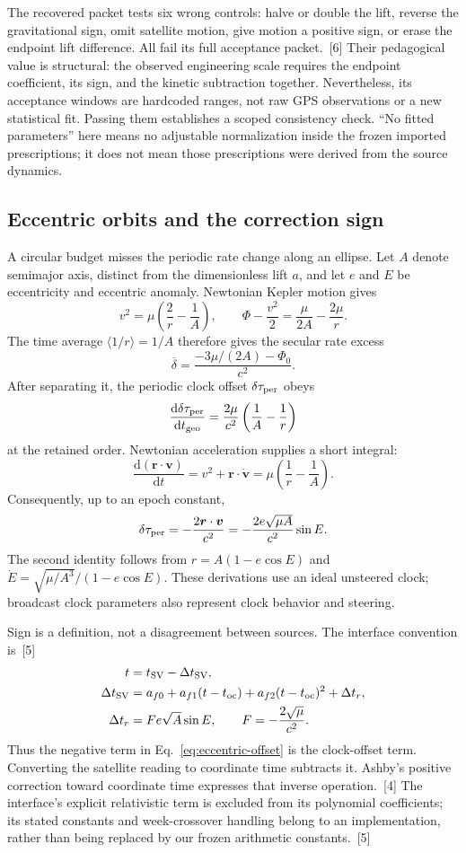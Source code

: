 \documentclass[10pt,twocolumn,letterpaper]{article}
\newcommand{\dd}{\mathrm{d}}
\begin{document}
The recovered packet tests six wrong controls: halve or double the lift, reverse the gravitational sign, omit satellite motion, give motion a positive sign, or erase the endpoint lift difference. All fail its full acceptance packet.~[6] Their pedagogical value is structural: the observed engineering scale requires the endpoint coefficient, its sign, and the kinetic subtraction together. Nevertheless, its acceptance windows are hardcoded ranges, not raw GPS observations or a new statistical fit. Passing them establishes a scoped consistency check. ``No fitted parameters'' here means no adjustable normalization inside the frozen imported prescriptions; it does not mean those prescriptions were derived from the source dynamics.


\subsection{Eccentric orbits and the correction sign}
A circular budget misses the periodic rate change along an ellipse. Let $A$ denote semimajor axis, distinct from the dimensionless lift $a$, and let $e$ and $E$ be eccentricity and eccentric anomaly. Newtonian Kepler motion gives
\[
 v^2=\mu\left(\frac 2r-\frac 1A\right),\qquad
 \Phi-\frac{v^2}{2}=\frac{\mu}{2A}-\frac{2\mu}{r}.
\]
The time average $\langle 1/r\rangle=1/A$ therefore gives the secular rate excess
\[
 \overline\delta=\frac{-3\mu/(2A)-\Phi_0}{c^2}.
\]
After separating it, the periodic clock offset $\delta\tau_{\rm per}$ obeys
\[
 \frac{\dd\delta\tau_{\rm per}}{\dd t_{\rm geo}}
 =\frac{2\mu}{c^2}\left(\frac 1A-\frac 1r\right)
\]
at the retained order. Newtonian acceleration supplies a short integral:
\[
 \frac{\dd(\bm r\cdot\bm v)}{\dd t}
 =v^2+\bm r\cdot\dot{\bm v}
 =\mu\left(\frac 1r-\frac 1A\right).
\]
Consequently, up to an epoch constant,
\begin{equation}
 \delta\tau_{\rm per}
 =-\frac{2\bm r\cdot\bm v}{c^2}
 =-\frac{2e\sqrt{\mu A}}{c^2}\sin E.
 \label{eq:eccentric-offset}
\end{equation}
The second identity follows from $r=A(1-e\cos E)$ and $\dot E=\sqrt{\mu/A^3}/(1-e\cos E)$. These derivations use an ideal unsteered clock; broadcast clock parameters also represent clock behavior and steering.

Sign is a definition, not a disagreement between sources. The interface convention is~[5]
\begin{align*}
 t&=t_{\rm SV}-\Delta t_{\rm SV},\\
 \Delta t_{\rm SV}
 &=a_{f 0}+a_{f 1}(t-t_{\rm oc})
   +a_{f 2}(t-t_{\rm oc})^2+\Delta t_r,\\
 \Delta t_r&=F e\sqrt A\sin E,\qquad
 F=-\frac{2\sqrt\mu}{c^2}.
\end{align*}
Thus the negative term in Eq.~\eqref{eq:eccentric-offset} is the clock-offset term. Converting the satellite reading to coordinate time subtracts it. Ashby's positive correction toward coordinate time expresses that inverse operation.~[4] The interface's explicit relativistic term is excluded from its polynomial coefficients; its stated constants and week-crossover handling belong to an implementation, rather than being replaced by our frozen arithmetic constants.~[5]
\end{document}
